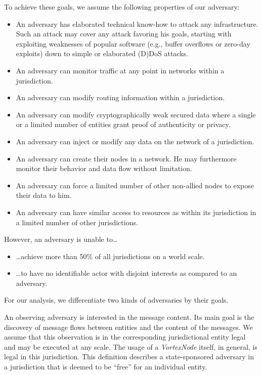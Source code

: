 \documentclass[acmsmall, screen, final]{acmart}
\begin{document}
	To achieve these goals, we assume the following properties of our adversary:
	\begin{itemize}
		\item An adversary has elaborated technical know-how to attack any infrastructure. Such an attack may cover any attack favoring his goals, starting with exploiting weaknesses of popular software (e.g., buffer overflows or zero-day exploits) down to simple or elaborated (D)DoS attacks.
		\item An adversary can monitor traffic at any point in networks within a jurisdiction.
		\item An adversary can modify routing information within a jurisdiction.
		\item An adversary can modify cryptographically weak secured data where a single or a limited number of entities grant proof of authenticity or privacy.
		\item An adversary can inject or modify any data on the network of a jurisdiction.
		\item An adversary can create their nodes in a network. He may furthermore monitor their behavior and data flow without limitation.
		\item An adversary can force a limited number of other non-allied nodes to expose their data to him. 
		\item An adversary can have similar access to resources as within its jurisdiction in a limited number of other jurisdictions.
	\end{itemize}
	
	However, an adversary is unable to\ldots\begin{itemize}
		\item \ldots{}achieve more than 50\% of all jurisdictions on a world scale. 
		\item \ldots{}to have no identifiable actor with disjoint interests as compared to an adversary.
	\end{itemize}
	
	For our analysis, we differentiate two kinds of adversaries by their goals.
	
	An observing adversary is interested in the message content. Its main goal is the discovery of message flows between entities and the content of the messages. We assume that this observation is in the corresponding jurisdictional entity legal and may be executed at any scale. The usage of a \emph{VortexNode} itself, in general, is legal in this jurisdiction. This definition describes a state-sponsored adversary in a jurisdiction that is deemed to be ``free'' for an individual entity.
	
\end{document}
